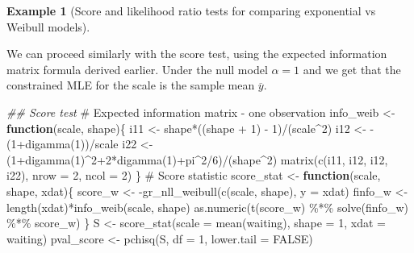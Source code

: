 \documentclass[
  11pt,
  letterpaper,
]{scrbook}
\newenvironment{Shaded}{\begin{snugshade}}{\end{snugshade}}
\newcommand{\AttributeTok}[1]{\textcolor[rgb]{0.40,0.45,0.13}{#1}}
\newcommand{\CommentTok}[1]{\textcolor[rgb]{0.37,0.37,0.37}{#1}}
\newcommand{\ConstantTok}[1]{\textcolor[rgb]{0.56,0.35,0.01}{#1}}
\newcommand{\ControlFlowTok}[1]{\textcolor[rgb]{0.00,0.23,0.31}{\textbf{#1}}}
\newcommand{\DecValTok}[1]{\textcolor[rgb]{0.68,0.00,0.00}{#1}}
\newcommand{\DocumentationTok}[1]{\textcolor[rgb]{0.37,0.37,0.37}{\textit{#1}}}
\newcommand{\FunctionTok}[1]{\textcolor[rgb]{0.28,0.35,0.67}{#1}}
\newcommand{\NormalTok}[1]{\textcolor[rgb]{0.00,0.23,0.31}{#1}}
\newcommand{\OtherTok}[1]{\textcolor[rgb]{0.00,0.23,0.31}{#1}}
\newcommand{\SpecialCharTok}[1]{\textcolor[rgb]{0.37,0.37,0.37}{#1}}
\theoremstyle{plain}
\theoremstyle{definition}
\newtheorem{example}{Example}[chapter]
\theoremstyle{definition}
\theoremstyle{plain}
\theoremstyle{remark}
\begin{document}
\begin{example}[Score and likelihood ratio tests for comparing
exponential vs Weibull
models]\protect\hypertarget{exm-weibull-scoretest}{}\label{exm-weibull-scoretest}

We can proceed similarly with the score test, using the expected
information matrix formula derived earlier. Under the null model
\(\alpha=1\) and we get that the constrained MLE for the scale is the
sample mean \(\overline{y}\).

\begin{Shaded}
\begin{Highlighting}[]
\DocumentationTok{\#\# Score test}
\CommentTok{\# Expected information matrix {-} one observation}
\NormalTok{info\_weib }\OtherTok{\textless{}{-}} \ControlFlowTok{function}\NormalTok{(scale, shape)\{ }
\NormalTok{  i11 }\OtherTok{\textless{}{-}}\NormalTok{ shape}\SpecialCharTok{*}\NormalTok{((shape }\SpecialCharTok{+} \DecValTok{1}\NormalTok{) }\SpecialCharTok{{-}} \DecValTok{1}\NormalTok{)}\SpecialCharTok{/}\NormalTok{(scale}\SpecialCharTok{\^{}}\DecValTok{2}\NormalTok{)}
\NormalTok{  i12 }\OtherTok{\textless{}{-}} \SpecialCharTok{{-}}\NormalTok{(}\DecValTok{1}\SpecialCharTok{+}\FunctionTok{digamma}\NormalTok{(}\DecValTok{1}\NormalTok{))}\SpecialCharTok{/}\NormalTok{scale}
\NormalTok{  i22 }\OtherTok{\textless{}{-}}\NormalTok{ (}\DecValTok{1}\SpecialCharTok{+}\FunctionTok{digamma}\NormalTok{(}\DecValTok{1}\NormalTok{)}\SpecialCharTok{\^{}}\DecValTok{2}\SpecialCharTok{+}\DecValTok{2}\SpecialCharTok{*}\FunctionTok{digamma}\NormalTok{(}\DecValTok{1}\NormalTok{)}\SpecialCharTok{+}\NormalTok{pi}\SpecialCharTok{\^{}}\DecValTok{2}\SpecialCharTok{/}\DecValTok{6}\NormalTok{)}\SpecialCharTok{/}\NormalTok{(shape}\SpecialCharTok{\^{}}\DecValTok{2}\NormalTok{)}
  \FunctionTok{matrix}\NormalTok{(}\FunctionTok{c}\NormalTok{(i11, i12, i12, i22), }\AttributeTok{nrow =} \DecValTok{2}\NormalTok{, }\AttributeTok{ncol =} \DecValTok{2}\NormalTok{)}
\NormalTok{\}}
\CommentTok{\# Score statistic}
\NormalTok{score\_stat }\OtherTok{\textless{}{-}} \ControlFlowTok{function}\NormalTok{(scale, shape, xdat)\{}
\NormalTok{  score\_w }\OtherTok{\textless{}{-}} \SpecialCharTok{{-}}\FunctionTok{gr\_nll\_weibull}\NormalTok{(}\FunctionTok{c}\NormalTok{(scale, shape), }\AttributeTok{y =}\NormalTok{ xdat)}
\NormalTok{  finfo\_w }\OtherTok{\textless{}{-}} \FunctionTok{length}\NormalTok{(xdat)}\SpecialCharTok{*}\FunctionTok{info\_weib}\NormalTok{(scale, shape)}
  \FunctionTok{as.numeric}\NormalTok{(}\FunctionTok{t}\NormalTok{(score\_w) }\SpecialCharTok{\%*\%} \FunctionTok{solve}\NormalTok{(finfo\_w) }\SpecialCharTok{\%*\%}\NormalTok{ score\_w)}
\NormalTok{\}}
\NormalTok{S }\OtherTok{\textless{}{-}} \FunctionTok{score\_stat}\NormalTok{(}\AttributeTok{scale =} \FunctionTok{mean}\NormalTok{(waiting), }\AttributeTok{shape =} \DecValTok{1}\NormalTok{, }\AttributeTok{xdat =}\NormalTok{ waiting)}
\NormalTok{pval\_score }\OtherTok{\textless{}{-}} \FunctionTok{pchisq}\NormalTok{(S, }\AttributeTok{df =} \DecValTok{1}\NormalTok{, }\AttributeTok{lower.tail =} \ConstantTok{FALSE}\NormalTok{)}


\end{Highlighting}
\end{Shaded}
\end{example}
\end{document}
